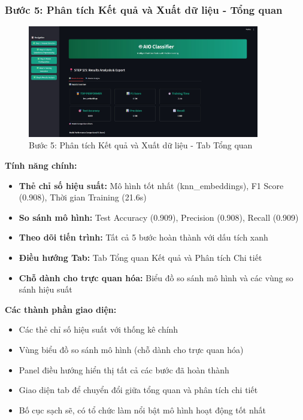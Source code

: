 \subsubsection{Bước 5: Phân tích Kết quả và Xuất dữ liệu - Tổng quan}

\begin{figure}[H]
    \centering
    \includegraphics[width=0.9\textwidth]{image/Step 5 -1.jpg}
    \caption{Bước 5: Phân tích Kết quả và Xuất dữ liệu - Tab Tổng quan}
    \label{fig:step5-overview}
\end{figure}

\textbf{Tính năng chính:}
\begin{itemize}
    \item \textbf{Thẻ chỉ số hiệu suất:} Mô hình tốt nhất (knn\_embeddings), F1 Score (0.908), Thời gian Training (21.6s)
    \item \textbf{So sánh mô hình:} Test Accuracy (0.909), Precision (0.908), Recall (0.909)
    \item \textbf{Theo dõi tiến trình:} Tất cả 5 bước hoàn thành với dấu tích xanh
    \item \textbf{Điều hướng Tab:} Tab Tổng quan Kết quả và Phân tích Chi tiết
    \item \textbf{Chỗ dành cho trực quan hóa:} Biểu đồ so sánh mô hình và các vùng so sánh hiệu suất
\end{itemize}

\textbf{Các thành phần giao diện:}
\begin{itemize}
    \item Các thẻ chỉ số hiệu suất với thống kê chính
    \item Vùng biểu đồ so sánh mô hình (chỗ dành cho trực quan hóa)
    \item Panel điều hướng hiển thị tất cả các bước đã hoàn thành
    \item Giao diện tab để chuyển đổi giữa tổng quan và phân tích chi tiết
    \item Bố cục sạch sẽ, có tổ chức làm nổi bật mô hình hoạt động tốt nhất
\end{itemize}

